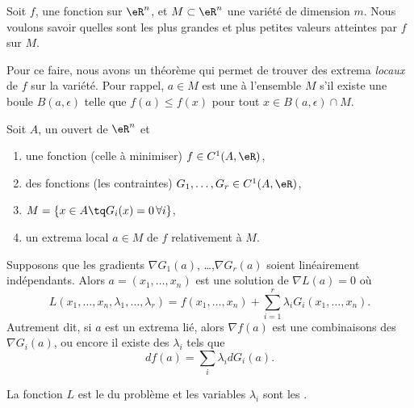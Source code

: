 Soit $f$, une fonction sur $\eR^n$, et $M\subset \eR^n$ une variété de dimension $m$. Nous voulons savoir quelles sont les plus grandes et plus petites valeurs atteintes par $f$ sur $M$.

Pour ce faire, nous avons un théorème qui permet de trouver des extrema \emph{locaux} de $f$ sur la variété. Pour rappel, $a\in M$ est une  à l'ensemble $M$ s'il existe une boule $B(a,\epsilon)$ telle que $f(a)\leq f(x)$ pour tout $x\in B(a,\epsilon)\cap M$.

\begin{theorem} \label{ThoRGJosS}
    Soit \( A\), un ouvert de \( \eR^n\) et
    \begin{enumerate}
        \item
            une fonction (celle à minimiser) $f\in C^1(A,\eR)$,
        \item 
            des fonctions (les contraintes) $G_1,\ldots,G_r\in C^1(A,\eR)$,
        \item
            $M=\{ x\in A\tq G_i(x)=0\,\forall i\}$,
        \item
            un extrema local $a\in M$ de $f$ relativement à $M$.
    \end{enumerate}
    Supposons que les gradients $\nabla G_1(a)$, \ldots,$\nabla G_r(a)$ soient linéairement indépendants. Alors $a=(x_1,\ldots,x_n)$ est une solution de \( \nabla L(a)=0\) où
    \begin{equation}
        L(x_1,\ldots,x_n,\lambda_1,\ldots,\lambda_r)=f(x_1,\ldots,x_n)+\sum_{i=1}^r\lambda_iG_i(x_1,\ldots,x_n).
    \end{equation}
    Autrement dit, si \( a\) est un extrema lié, alors \( \nabla f(a)\) est une combinaisons des \( \nabla G_i(a)\), ou encore il existe des \( \lambda_i\) tels que
    \begin{equation}    \label{EqRDsSXyZ}
        df(a)=\sum_i\lambda_idG_i(a).
    \end{equation}
\end{theorem}
La fonction $L$ est le  du problème et les variables \( \lambda_i\) sont les .

